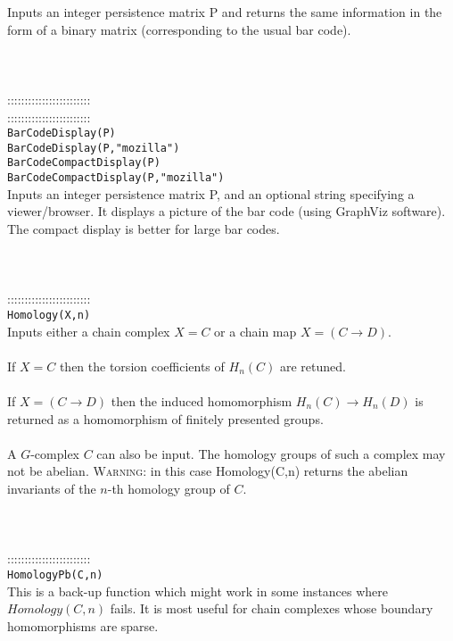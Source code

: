 \documentclass[a4paper,11pt]{report}
\begin{document}
{ Inputs an integer persistence matrix P and returns the same information in the
form of a binary matrix (corresponding to the usual bar code). \\
 \\
 \\
 \\
 ::::::::::::::::::::::::\\
 ::::::::::::::::::::::::\\
 \texttt{BarCodeDisplay(P)}\\
 \texttt{BarCodeDisplay(P,"mozilla")}\\
 \texttt{BarCodeCompactDisplay(P)}\\
 \texttt{BarCodeCompactDisplay(P,"mozilla")}\\
 

 Inputs an integer persistence matrix P, and an optional string specifying a
viewer/browser. It displays a picture of the bar code (using GraphViz
software). The compact display is better for large bar codes. \\
 \\
 \\
 \\
 ::::::::::::::::::::::::\\
 \texttt{Homology(X,n)}\\
 

 Inputs either a chain complex $X=C$ or a chain map $X=(C \longrightarrow D)$. \\
 \\
If $X=C$ then the torsion coefficients of $H_n(C)$ are retuned.\\
 \\
 If $X=(C \longrightarrow D)$ then the induced homomorphism $H_n(C) \longrightarrow H_n(D)$ is returned as a homomorphism of finitely presented groups. \\
 \\
 A $G$-complex $C$ can also be input. The homology groups of such a complex may not be abelian. \textsc{Warning:} in this case Homology(C,n) returns the abelian invariants of the $n$-th homology group of $C$. \\
 \\
 \\
 \\
 ::::::::::::::::::::::::\\
 \texttt{HomologyPb(C,n)}\\
 

 This is a back-up function which might work in some instances where $Homology(C,n)$ fails. It is most useful for chain complexes whose boundary homomorphisms are
sparse. 

}
\end{document}

